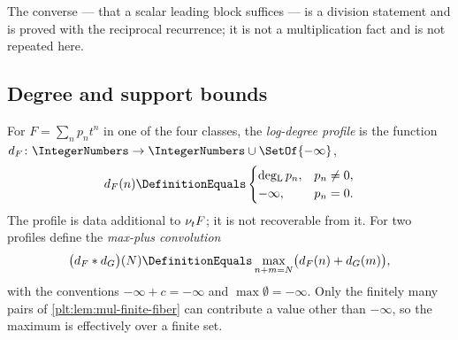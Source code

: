The converse --- that a scalar leading block suffices --- is a division
statement and is proved with the reciprocal recurrence; it is not a
multiplication fact and is not repeated here.

\subsection{Degree and support bounds}
\label{plt:sec:mul-degree}

\begin{definition}
\label{plt:def:mul-profile}
For $F=\sum_np_nt^n$ in one of the four classes, the \emph{log-degree
profile} is the function $\dprofile{F}\colon\IntegerNumbers\to
\IntegerNumbers\cup\SetOf{-\infty}$,
\begin{equation}\label{plt:eq:mul-profile}
 \dprofile{F}(n)\DefinitionEquals
 \begin{cases}
  \degL p_n,&p_n\ne0,\\
  -\infty,&p_n=0.
 \end{cases}
\end{equation}
The profile is data additional to $\nu_{t} F$; it is not recoverable from it.
For two profiles define the \emph{max-plus convolution}
\begin{equation}\label{plt:eq:mul-maxplus}
 \bigl(\dprofile{F}\ast\dprofile{G}\bigr)(N)
 \DefinitionEquals
 \max_{n+m=N}\bigl(\dprofile{F}(n)+\dprofile{G}(m)\bigr),
\end{equation}
with the conventions $-\infty+c=-\infty$ and $\max\emptyset=-\infty$.  Only
the finitely many pairs of \cref{plt:lem:mul-finite-fiber} can contribute a
value other than $-\infty$, so the maximum is effectively over a finite set.
\end{definition}

